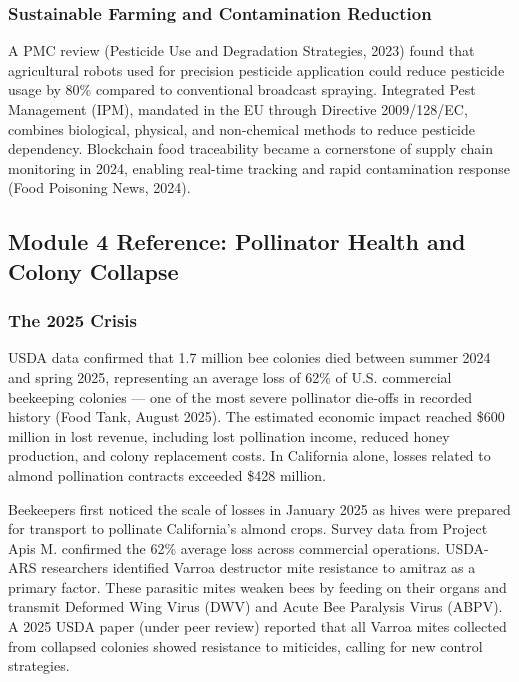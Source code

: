 \documentclass[11pt,letterpaper]{article}
\begin{document}
\subsubsection{Sustainable Farming and Contamination Reduction}

A PMC review (Pesticide Use and Degradation Strategies, 2023) found that agricultural robots used for precision pesticide application could reduce pesticide usage by 80\% compared to conventional broadcast spraying. Integrated Pest Management (IPM), mandated in the EU through Directive 2009/128/EC, combines biological, physical, and non-chemical methods to reduce pesticide dependency. Blockchain food traceability became a cornerstone of supply chain monitoring in 2024, enabling real-time tracking and rapid contamination response (Food Poisoning News, 2024).

\subsection{Module 4 Reference: Pollinator Health and Colony Collapse}

\subsubsection{The 2025 Crisis}

USDA data confirmed that 1.7 million bee colonies died between summer 2024 and spring 2025, representing an average loss of 62\% of U.S. commercial beekeeping colonies --- one of the most severe pollinator die-offs in recorded history (Food Tank, August 2025). The estimated economic impact reached \$600 million in lost revenue, including lost pollination income, reduced honey production, and colony replacement costs. In California alone, losses related to almond pollination contracts exceeded \$428 million.

Beekeepers first noticed the scale of losses in January 2025 as hives were prepared for transport to pollinate California's almond crops. Survey data from Project Apis M. confirmed the 62\% average loss across commercial operations. USDA-ARS researchers identified Varroa destructor mite resistance to amitraz as a primary factor. These parasitic mites weaken bees by feeding on their organs and transmit Deformed Wing Virus (DWV) and Acute Bee Paralysis Virus (ABPV). A 2025 USDA paper (under peer review) reported that all Varroa mites collected from collapsed colonies showed resistance to miticides, calling for new control strategies.
\end{document}
